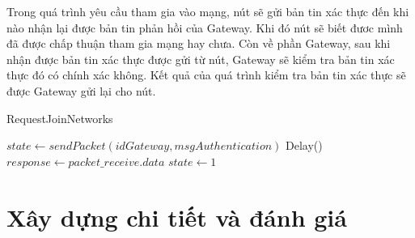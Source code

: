 \par 
Trong quá trình yêu cầu tham gia vào mạng, nút sẽ gửi bản tin xác thực đến khi nào nhận lại được bản tin phản hồi của Gateway. Khi đó nút sẽ biết đươc mình đã được chấp thuận tham gia mạng hay chưa. Còn về phần Gateway, sau khi nhận được bản tin xác thực được gửi từ nút, Gateway sẽ kiểm tra bản tin xác thực đó có chính xác không. Kết quả của quá trình kiểm tra bản tin xác thực sẽ được Gateway gửi lại cho nút.
\begin{algorithm}[H]
\caption{RequestJoinNetworks}
\label{RequestJoinNetworks}
\begin{algorithmic}[1]
	\Repeat
			\State $state \gets sendPacket(idGateway, msgAuthentication)$ 
				\State Delay()
				\State $response \gets packet\_receive.data$
					\State $state \gets 1$
				\EndIf
			\EndIf
  \EndProcedure
\end{algorithmic}
\end{algorithm}
\section{Xây dựng chi tiết và đánh giá}
